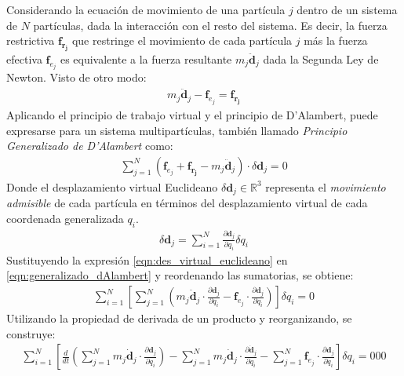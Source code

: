 Considerando la ecuación de movimiento de una partícula $j$ dentro de un sistema de $N$ partículas, dada la interacción
    con el resto del sistema. Es decir, la fuerza restrictiva $\boldsymbol{f_{r_j}}$ que restringe el movimiento de cada partícula $j$
    más la fuerza efectiva $\boldsymbol{f}_{e_j}$ es equivalente a la fuerza resultante $m_j \boldsymbol{\ddot{d}}_j$ dada
    la Segunda Ley de Newton. Visto de otro modo: 
    \begin{align}
        \label{eqn:DL_1particula}
         m_j \boldsymbol{\ddot{d}}_j - \boldsymbol{f}_{e_j} = \boldsymbol{f_{r_j}}
    \end{align}
    Aplicando el principio de trabajo virtual y el principio de D'Alambert, puede expresarse para un sistema multipartículas,
    también llamado \emph{Principio Generalizado de D'Alambert} como:
    \begin{align}
        \label{eqn:generalizado_dAlambert}
         \sum_{j=1}^{N} \left( \boldsymbol{f}_{e_j} + \boldsymbol{f_{r_j}}-m_j \boldsymbol{\ddot{d}}_j \right)
         \cdot \delta \boldsymbol{d}_j = 0
    \end{align}
    Donde el desplazamiento virtual Euclideano $\delta \boldsymbol{d}_j \in \mathbb{R}^3$ representa el \emph{movimiento
    admisible} de cada partícula en términos del desplazamiento virtual de cada coordenada generalizada $q_i$.
    \begin{align}
        \label{eqn:des_virtual_euclideano}
        \delta \boldsymbol{d}_j = \sum_{i=1}^N \frac{\partial \boldsymbol{d}_j }{\partial q_i} \delta q_i
    \end{align}
    Sustituyendo la expresión \ref{eqn:des_virtual_euclideano} en \ref{eqn:generalizado_dAlambert} y reordenando las
    sumatorias, se obtiene:
    \begin{align}
        \label{eqn:sum_DL}
         \sum_{i=1}^N \left[ \sum_{j=1}^N \left(m_j \boldsymbol{\ddot{d}}_j \cdot \frac{\partial \boldsymbol{d}_j }{\partial q_i}
         - \boldsymbol{f}_{e_j} \cdot \frac{\partial \boldsymbol{d}_j }{\partial q_i} \right) \right] \delta q_i = 0
    \end{align}
    Utilizando la propiedad de derivada de un producto y reorganizando, se construye:
    \begin{align}
        \label{eqn:sum2_DL}
         \sum_{i=1}^N \left[ \frac{d}{dt} \left( \sum_{j=1}^N m_j \boldsymbol{\dot{d}}_j \cdot \frac{\partial \boldsymbol{d}_j }{\partial q_i}\right)
         - \sum_{j=1}^N m_j \boldsymbol{\dot{d}}_j \cdot \frac{\partial \boldsymbol{\dot{d}}_j }{\partial q_i} - \sum_{j=1}^N
         \boldsymbol{f}_{e_j} \cdot \frac{\partial \boldsymbol{d}_j }{\partial q_i} \right] \delta q_i = 000
    \end{align}